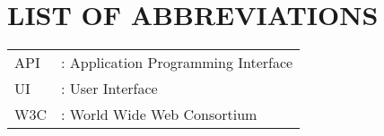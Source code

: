 \newpage
\chapter*{LIST OF ABBREVIATIONS}
\begin{tabular}{l l}
API	&	:	Application Programming Interface	\\
UI	&	:	User Interface \\
W3C	&	:	World Wide Web Consortium \\


\end{tabular}








